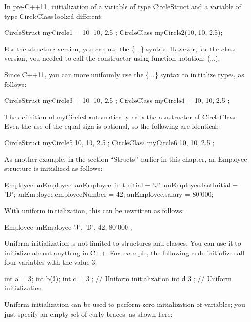 In pre-C++11, initialization of a variable of type CircleStruct and a variable of type CircleClass looked different:

\begin{cpp}
CircleStruct myCircle1 = { 10, 10, 2.5 };
CircleClass myCircle2(10, 10, 2.5);
\end{cpp}

For the structure version, you can use the \{...\} syntax. However, for the class version, you needed to call the constructor using function notation: (...).

Since C++11, you can more uniformly use the \{...\} syntax to initialize types, as follows:

\begin{cpp}
CircleStruct myCircle3 = { 10, 10, 2.5 };
CircleClass myCircle4 = { 10, 10, 2.5 };
\end{cpp}

The definition of myCircle4 automatically calls the constructor of CircleClass. Even the use of the equal sign is optional, so the following are identical:

\begin{cpp}
CircleStruct myCircle5 { 10, 10, 2.5 };
CircleClass myCircle6 { 10, 10, 2.5 };
\end{cpp}

As another example, in the section “Structs” earlier in this chapter, an Employee structure is initialized as follows:

\begin{cpp}
Employee anEmployee;
anEmployee.firstInitial = 'J';
anEmployee.lastInitial = 'D';
anEmployee.employeeNumber = 42;
anEmployee.salary = 80'000;
\end{cpp}

With uniform initialization, this can be rewritten as follows:

\begin{cpp}
Employee anEmployee { 'J', 'D', 42, 80'000 };
\end{cpp}

Uniform initialization is not limited to structures and classes. You can use it to initialize almost anything in C++. For example, the following code initializes all four variables with the value 3:

\begin{cpp}
int a = 3;
int b(3);
int c = { 3 }; // Uniform initialization
int d { 3 }; // Uniform initialization
\end{cpp}

Uniform initialization can be used to perform zero-initialization of variables; you just specify an empty set of curly braces, as shown here:


